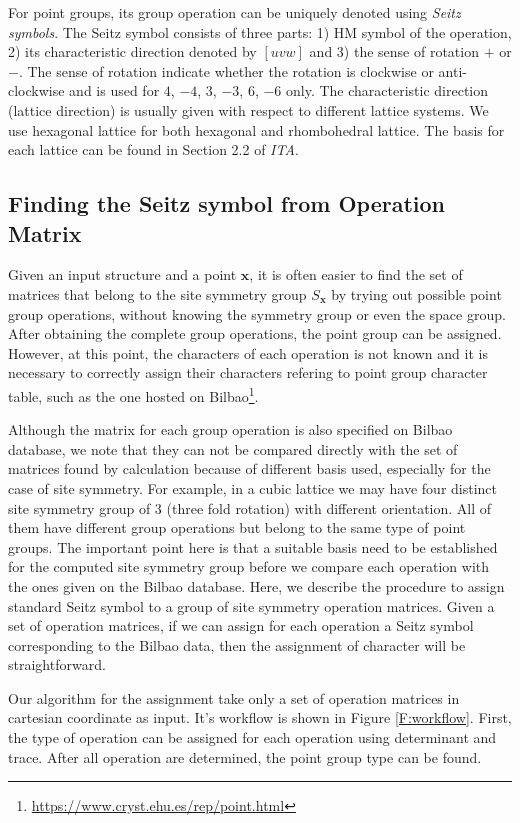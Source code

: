 \documentclass{article}
\begin{document}
For point groups, its group operation can be uniquely denoted using \emph{Seitz symbols}. The Seitz symbol consists of 
three parts: 1) HM symbol of the operation, 2) its characteristic direction denoted by $[uvw]$ and 3) the sense of rotation $+$ or $-$. 
The sense of rotation indicate whether the rotation is clockwise or anti-clockwise and is used for $4$, $-4$, $3$, $-3$, $6$, $-6$ only.
The characteristic direction (lattice direction) is usually given with respect to different lattice systems. We use hexagonal lattice 
for both hexagonal and rhombohedral lattice. The basis for each lattice can be found in Section 2.2 of \emph{ITA}. 

\subsection{Finding the Seitz symbol from Operation Matrix}
Given an input structure and a point $\mathbf{x}$, it is often easier to find the set of matrices that belong to the site symmetry group
$S_{\mathbf{x}}$ by trying out possible point group operations, without knowing the symmetry group or even the space group\cite{togo_spglib_2018}. 
After obtaining the complete group operations, the point group can be assigned. However, at this point, the characters of each operation is
not known and it is necessary to correctly assign their characters refering to point group character table, such as the one hosted on 
Bilbao\footnote{\url{https://www.cryst.ehu.es/rep/point.html}}. 

Although the matrix for each group operation is also specified on Bilbao database, we note that they can not be compared directly with the 
set of matrices found by calculation because of different basis used, especially for the case of site symmetry. For example, in a cubic lattice 
we may have four distinct site symmetry group of $3$ (three fold rotation) with different orientation. All of them have different 
group operations but belong to the same type of point groups. The important point here is that a suitable basis need to be established for 
the computed site symmetry group before we compare each operation with the ones given on the Bilbao database. Here, we describe the procedure
to assign standard Seitz symbol to a group of site symmetry operation matrices. Given a set of operation matrices, if we can assign for 
each operation a Seitz symbol corresponding to the Bilbao data, then the assignment of character will be straightforward.

Our algorithm for the assignment take only a set of operation matrices in cartesian coordinate as input. 
It's workflow is shown in Figure \ref{F:workflow}. 
First, the type of operation can be assigned for each operation using determinant and trace. After all operation are determined, the 
point group type can be found. 
\end{document}
